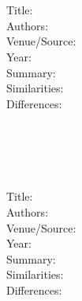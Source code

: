 \documentclass[letterpaper,12pt]{article}
\begin{document}
\section{~\cite{}}
\begin{description}
 \item[Title:] 
 \item[Authors:] 
 \item[Venue/Source:] 
 \item[Year:] 
 \item[Summary:] 
 \item[Similarities:] 
 \item[Differences:] 
\end{description}

\section{~\cite{}}
\begin{description}
 \item[Title:] 
 \item[Authors:] 
 \item[Venue/Source:] 
 \item[Year:] 
 \item[Summary:] 
 \item[Similarities:] 
 \item[Differences:] 
\end{description}



\end{document}
